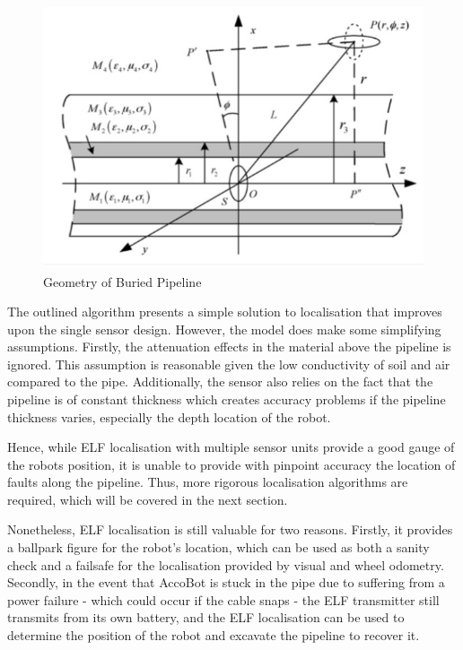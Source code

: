 \documentclass[11pt]{article}		%
\newlength{\imageheight}	 %
\newcommand{\supercite}[1]{\textsuperscript{\cite{#1}}}		%
\begin{document}
			\begin{figure}[h]
				\centering
				\includegraphics[height=\imageheight]{localisation}
				\caption{Geometry of Buried Pipeline\supercite{ELFTransmitter}}
				\label{localisation}
			\end{figure}
			
			The outlined algorithm presents a simple solution to localisation that improves upon the single sensor design. However, the model does make some simplifying assumptions. Firstly, the attenuation effects in the material above the pipeline is ignored. This assumption is reasonable given the low conductivity of soil and air compared to the pipe. Additionally, the sensor also relies on the fact that the pipeline is of constant thickness which creates accuracy problems if the pipeline thickness varies, especially the depth location of the robot. 
			
			\hspace*{3ex}Hence, while ELF localisation with multiple sensor units provide a good gauge of the robots position, it is unable to provide with pinpoint accuracy the location of faults along the pipeline. Thus, more rigorous localisation algorithms are required, which will be covered in the next section. 
			
			\hspace*{3ex}Nonetheless, ELF localisation is still valuable for two reasons. Firstly, it provides a ballpark figure for the robot's location, which can be used as both a sanity check and a failsafe for the localisation provided by visual and wheel odometry.  Secondly, in the event that AccoBot is stuck in the pipe due to suffering from a power failure - which could occur if the cable snaps - the ELF transmitter still transmits from its own battery, and the ELF localisation can be used to determine the position of the robot and excavate the pipeline to recover it. 
			
\end{document}

